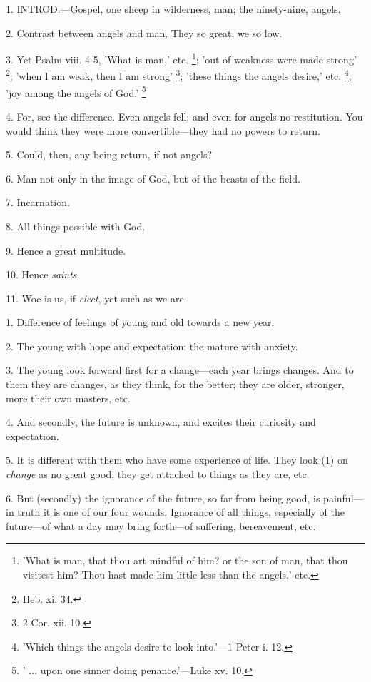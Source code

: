 
1. INTROD.—Gospel,
one sheep in wilderness, man; the ninety-nine, angels.

2. Contrast between angels and man. They so
great, we so low.

3. Yet Psalm viii. 4-5, 'What is man,' etc. \footnote{'What is man, that thou
art mindful of him? or the son of man, that thou visitest him? Thou
hast made him little less than the angels,' etc.}; 'out of weakness were made strong' \footnote{Heb. xi. 34.}; 'when I am weak, then I am strong' \footnote{2 Cor. xii. 10.}; 'these things the angels desire,' etc. \footnote{'Which things the angels
desire to look into.'—1 Peter i. 12.}; 'joy among the angels of God.' \footnote{' ... upon one sinner
doing penance.'—Luke xv. 10.}

4. For, see the difference. Even angels fell; and
even for angels no restitution. You would think they were more
convertible—they had no powers to return.

5. Could, then, any being return, if not angels?

6. Man not only in the image of God, but of the
beasts of the field.

7. Incarnation.

8. All things possible with God.

9. Hence a great multitude.

10. Hence \emph{saints}.

11. Woe is us, if \emph{elect}, yet such as we
are.


1. Difference of feelings of young and old
towards a new year.

2. The young with hope and expectation; the
mature with anxiety.

3. The young look forward first for a
change—each year brings changes. And to them they are changes, as
they think, for the better; they are older, stronger, more their own
masters, etc.

4. And secondly, the future is unknown, and
excites their curiosity and expectation.

5. It is different with them who have some
experience of life. They look (1) on \emph{change} as no great good;
they get attached to things as they are, etc.

6. But (secondly) the ignorance of the future, so
far from being good, is painful—in truth it is one of our four
wounds. Ignorance of all things, especially of the future—of what a
day may bring forth—of suffering, bereavement, etc.

